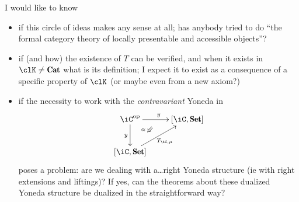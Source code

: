 \documentclass[a4paper,10pt]{amsart}
\begin{document}
I would like to know
\begin{itemize}
\item if this circle of ideas makes any sense at all; has anybody tried to do ``the formal category theory of locally presentable and accessible objects''?
\item if (and how) the existence of $T$ can be verified, and when it exists in $\clK \neq\Cat$ what is its definition; I expect it to exist as a consequence of a specific property of $\clK$ (or maybe even from a new axiom?)
\item if the necessity to work with the \emph{contravariant} Yoneda in
\[
\xymatrix{
	\iC^\opp \ar[r]^y \ar[d]_y \ar@{}[dr]|(.3){\alpha\Swarrow} & [\iC,\Set]\\
	[\iC,\Set]\ar[ur]_{T_{\iC,\mu}} & 
}
\]
poses a problem: are we dealing with a\dots right Yoneda structure (ie with right extensions and liftings)? If yes, can the theorems about these dualized Yoneda structure be dualized in the straightforward way?
\end{itemize}

{}

\hrulefill 
\end{document}
